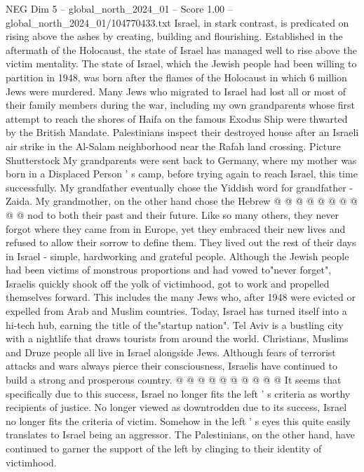 \begin{textsample}{NEG Dim 5 – global\_north\_2024\_01 – Score 1.00 – global\_north\_2024\_01/104770433.txt}  \label{ex:f5_neg_320}
Israel, in stark contrast, is predicated on rising above the ashes by creating, building and flourishing.
Established in the aftermath of the Holocaust, the state of Israel has managed well to rise above the victim mentality.
The state of Israel, which the Jewish people had been willing to partition in 1948, was born after the flames of the Holocaust in which 6 million Jews were murdered.
Many Jews who migrated to Israel had lost all or most of their family members during the war, including my own grandparents whose first attempt to reach the shores of Haifa on the famous Exodus Ship were thwarted by the British Mandate.
Palestinians inspect their destroyed house after an Israeli air strike in the Al-Salam neighborhood near the Rafah land crossing.
Picture Shutterstock My grandparents were sent back to Germany, where my mother was born in a Displaced Person ' s camp, before trying again to reach Israel, this time successfully.
My grandfather eventually chose the Yiddish word for grandfather - Zaida.
My grandmother, on the other hand chose the Hebrew @ @ @ @ @ @ @ @ @ @ nod to both their past and their future.
Like so many others, they never forgot where they came from in Europe, yet they embraced their new lives and refused to allow their sorrow to define them.
They lived out the rest of their days in Israel - simple, hardworking and grateful people.
Although the Jewish people had been victims of monstrous proportions and had vowed to"never forget", Israelis quickly shook off the yolk of victimhood, got to work and propelled themselves forward.
This includes the many Jews who, after 1948 were evicted or expelled from Arab and Muslim countries.
Today, Israel has turned itself into a hi-tech hub, earning the title of the"startup nation".
Tel Aviv is a bustling city with a nightlife that draws tourists from around the world.
Christians, Muslims and Druze people all live in Israel alongside Jews.
Although fears of terrorist attacks and wars always pierce their consciousness, Israelis have continued to build a strong and prosperous country. @ @ @ @ @ @ @ @ @ @ It seems that specifically due to this success, Israel no longer fits the left ' s criteria as worthy recipients of justice.
No longer viewed as downtrodden due to its success, Israel no longer fits the criteria of victim.
Somehow in the left ' s eyes this quite easily translates to Israel being an aggressor.
The Palestinians, on the other hand, have continued to garner the support of the left by clinging to their identity of victimhood.

\end{textsample}
